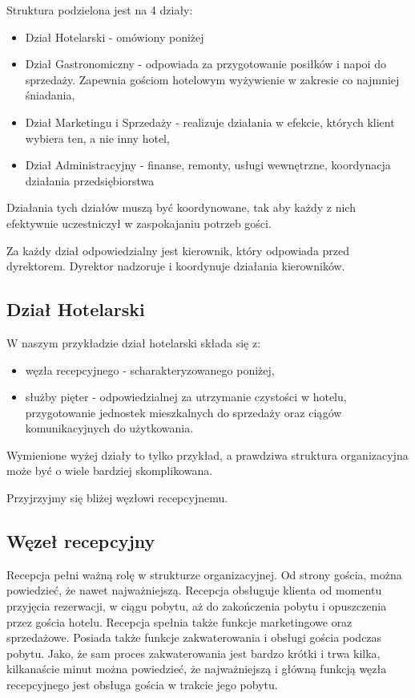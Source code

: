 \documentclass[a4paper,onecolumn,oneside,11pt,wide,floatssmall]{mwrep}
\theoremstyle{definition}
\theoremstyle{plain}%
\theoremstyle{remark}
\begin{document}
Struktura podzielona jest na 4 działy:
\begin{itemize}
  \item Dział Hotelarski - omówiony poniżej
  \item Dział Gastronomiczny - odpowiada za przygotowanie posiłków i napoi 
  do sprzedaży. Zapewnia gościom hotelowym wyżywienie w zakresie co najmniej 
  śniadania,
  \item Dział Marketingu i Sprzedaży - realizuje działania w efekcie, 
  których klient wybiera ten, a nie inny hotel,
  \item Dział Administracyjny - finanse, remonty, usługi wewnętrzne, 
  koordynacja działania przedsiębiorstwa
\end{itemize}

Działania tych działów muszą być koordynowane, tak aby każdy z nich 
efektywnie uczestniczył w zaspokajaniu potrzeb gości.

Za każdy dział odpowiedzialny jest kierownik, który odpowiada przed 
dyrektorem. Dyrektor nadzoruje i koordynuje działania kierowników.

\subsection{Dział Hotelarski}
W naszym przykładzie dział hotelarski składa się z:
\begin{itemize}
  \item węzła recepcyjnego - scharakteryzowanego poniżej,
  \item służby pięter - odpowiedzialnej za utrzymanie czystości w hotelu, 
  przygotowanie jednostek mieszkalnych do sprzedaży oraz ciągów 
  komunikacyjnych do użytkowania.
\end{itemize}

Wymienione wyżej działy to tylko przykład, a prawdziwa struktura 
organizacyjna może być o wiele bardziej skomplikowana.

Przyjrzyjmy się bliżej węzłowi recepcyjnemu.

\subsection{Węzeł recepcyjny}
Recepcja pełni ważną rolę w strukturze organizacyjnej. Od strony gościa, 
można powiedzieć, że nawet najważniejszą. 
Recepcja obsługuje klienta od momentu przyjęcia rezerwacji, w ciągu pobytu, 
aż do zakończenia pobytu i opuszczenia przez gościa hotelu. Recepcja spełnia 
także funkcje marketingowe 
oraz sprzedażowe. Posiada także funkcje zakwaterowania i obsługi gościa 
podczas pobytu. Jako, że sam proces zakwaterowania jest bardzo krótki i trwa 
kilka, kilkanaście minut można powiedzieć, że najważniejszą i główną funkcją 
węzła recepcyjnego jest obsługa gościa w trakcie jego pobytu.
\end{document}
